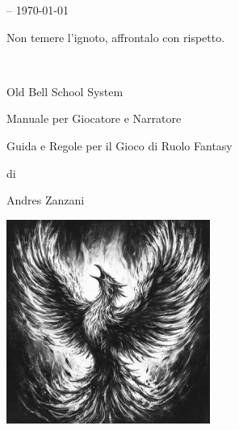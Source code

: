 \vfill

\begin{center}\textbf{\versione} -- \today\end{center}

\vspace{1cm}


\begin{enfasi}
Non temere l'ignoto, affrontalo con rispetto.
\end{enfasi}

\thispagestyle{empty}

\newpage~\thispagestyle{empty}%

\pagebreak

{\Huge \begin{center} Old Bell School System \end{center}}

\bigskip

\begin{center}{\LARGE Manuale per Giocatore e Narratore}\\ \end{center}

{\large \begin{center} Guida e Regole per il Gioco di Ruolo Fantasy \end{center}}

\begin{center}di \end{center}

{\LARGE \begin{center} Andres Zanzani \end{center}}

\vspace{2cm}

\begin{center}
\includegraphics[keepaspectratio,width=0.50\textwidth]{immagini/phoenix-ai.png}
\end{center}

